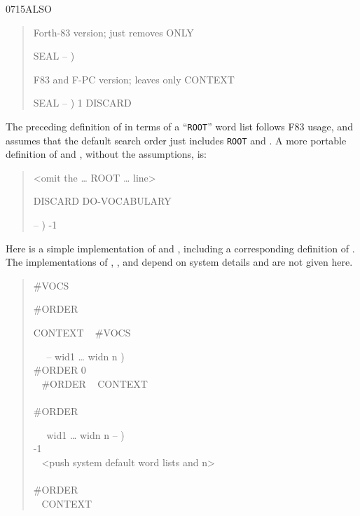 \begin{newword}{0715}{ALSO}
\begin{rationale}
\begin{quote}
		 Forth-83 version; just removes ONLY

		\word{:} SEAL  -- )
			 
			 
		\word{;}

		 F83 and F-PC version; leaves only CONTEXT

		\word{:} SEAL  -- )
			 
			1  DISCARD
		\word{;}
		\end{quote}

		The preceding definition of  in terms of a
		``\texttt{ROOT}'' word list follows F83 usage, and assumes
		that the default search order just includes \texttt{ROOT} and
		. A more portable definition of  and
		, without the assumptions, is:
		\begin{quote}\ttfamily
		<omit the {\ldots}
			  ROOT
		{\ldots} line>

		  
			 \word[core]{,} DISCARD DO-VOCABULARY

		\word[core]{:}   -- )
			-1 
		\word[core]{;}
		\end{quote}

		Here is a simple implementation of  and
		, including a corresponding definition of
		. The implementations of ,
		,  and
		 depend on system details and are not given
		here.

		\begin{quote}  \#VOCS

		 \#ORDER

		 CONTEXT ~ \#VOCS  

		\word{:} ~~ -- wid1 {\ldots} widn n ) \\
		\tab \#ORDER  0  \\
		\tab~ \#ORDER  ~  \word{-}
			    CONTEXT \word{+}  \\
		\tab {} \\
		\tab \#ORDER  \\
		\word{;}

		\word{:} ~~ wid1 {\ldots} widn n -- ) \\
		\tab {} -1 \word{=}  \\
		\tab~  <push system default word lists and n> \\
		\tab {} \\
		\tab {} \#ORDER \word{!} \\
		  ~
			  CONTEXT \word{+} \word{!}
		 \\
		\word{;}


\end{quote}
\end{rationale}
\end{newword}
